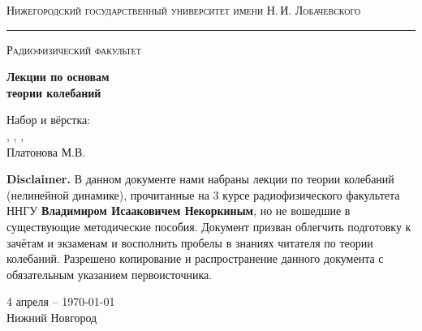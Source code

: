 \begin{titlepage}
\thispagestyle{empty}

\begin{center}
	{\small\textsc{Нижегородский государственный университет имени Н.\,И. Лобачевского}}
	\vskip 3pt \hrule \vskip 5pt
	{\small\textsc{Радиофизический факультет}}

	\vfill

	\begin{spacing}{2}
	{\Huge \bf  Лекции по основам \\ теории колебаний}\\%
	\end{spacing}
	{ Набор и вёрстка:}\\[.5em]
	{ 	\href{https://github.com/AnnaKarusevich}{\color{black}{Карусевич А.А.}}
		\href{https://github.com/KirillPonur}{\color{black}{Понур К.А.}},
		\href{https://github.com/fedorsarafanov}{\color{black}{Сарафанов Ф.Г.}}, 
		\href{https://github.com/BigBigGamer}{\color{black}{Шиков А.П.}},
	\\ Платонова М.В.}\\[2em]
	\vspace{1em}
\end{center}

\textbf{Disclaimer.} В данном документе нами набраны лекции по теории колебаний (нелинейной динамике), прочитанные на 3 курсе радиофизического факультета ННГУ \textbf{Владимиром Исааковичем Некоркиным}, но не вошедшие в существующие методические пособия. Документ призван облегчить подготовку к зачётам и экзаменам и восполнить пробелы в знаниях читателя по теории колебаний. Разрешено копирование и распространение данного документа с обязательным указанием первоисточника. 


\begin{center}
	\vfill
	4 апреля -- \today\\Нижний Новгород
\end{center}

\end{titlepage}

